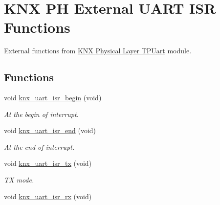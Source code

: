 \hypertarget{group___k_n_x___p_h___sup___external___functions}{}\section{K\+NX PH External U\+A\+RT I\+SR Functions}
\label{group___k_n_x___p_h___sup___external___functions}


External functions from \hyperlink{group___k_n_x___p_h___t_p_uart}{K\+NX Physical Layer T\+P\+Uart} module.  


\subsection*{Functions}
\begin{DoxyCompactItemize}
\item 
void \hyperlink{group___k_n_x___p_h___sup___external___functions_gafa12b387b549bde1cd74e212853555cd}{knx\+\_\+uart\+\_\+isr\+\_\+begin} (void)\hypertarget{group___k_n_x___p_h___sup___external___functions_gafa12b387b549bde1cd74e212853555cd}{}\label{group___k_n_x___p_h___sup___external___functions_gafa12b387b549bde1cd74e212853555cd}

\begin{DoxyCompactList}\small\item\em At the begin of interrupt. \end{DoxyCompactList}\item 
void \hyperlink{group___k_n_x___p_h___sup___external___functions_ga64023e4e19c0ab94045d590c0730e758}{knx\+\_\+uart\+\_\+isr\+\_\+end} (void)\hypertarget{group___k_n_x___p_h___sup___external___functions_ga64023e4e19c0ab94045d590c0730e758}{}\label{group___k_n_x___p_h___sup___external___functions_ga64023e4e19c0ab94045d590c0730e758}

\begin{DoxyCompactList}\small\item\em At the end of interrupt. \end{DoxyCompactList}\item 
void \hyperlink{group___k_n_x___p_h___sup___external___functions_ga25d5c961e17de3ba8faff2175f245947}{knx\+\_\+uart\+\_\+isr\+\_\+tx} (void)\hypertarget{group___k_n_x___p_h___sup___external___functions_ga25d5c961e17de3ba8faff2175f245947}{}\label{group___k_n_x___p_h___sup___external___functions_ga25d5c961e17de3ba8faff2175f245947}

\begin{DoxyCompactList}\small\item\em TX mode. \end{DoxyCompactList}\item 
void \hyperlink{group___k_n_x___p_h___sup___external___functions_ga551e6416873aec386f6bbb391edad6d5}{knx\+\_\+uart\+\_\+isr\+\_\+rx} (void)\hypertarget{group___k_n_x___p_h___sup___external___functions_ga551e6416873aec386f6bbb391edad6d5}{}\label{group___k_n_x___p_h___sup___external___functions_ga551e6416873aec386f6bbb391edad6d5}


\end{DoxyCompactItemize}
